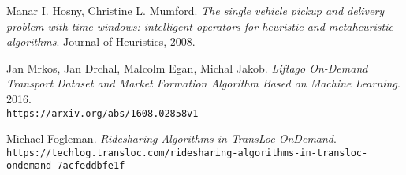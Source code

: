 \documentclass{article}
\begin{document}
\begin{thebibliography}{9}
Manar I. Hosny, Christine L. Mumford.
\textit{The single vehicle pickup and delivery problem with time windows: intelligent operators for heuristic and metaheuristic algorithms}.
Journal of Heuristics, 2008.

Jan Mrkos, Jan Drchal, Malcolm Egan, Michal Jakob.
\textit{Liftago On-Demand Transport Dataset and Market Formation Algorithm Based on Machine Learning}.
2016. 
\\\texttt{https://arxiv.org/abs/1608.02858v1}

Michael Fogleman.
\textit{Ridesharing Algorithms in TransLoc OnDemand}.
\\\texttt{https://techlog.transloc.com/ridesharing-algorithms-in-transloc-ondemand-7acfeddbfe1f}
\end{thebibliography}
\end{document}
